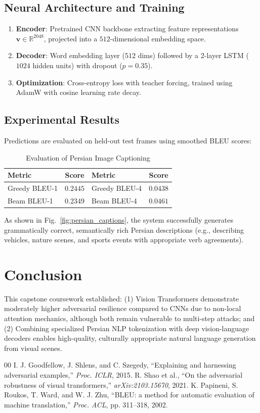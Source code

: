 \documentclass[conference]{IEEEtran}
\begin{document}
\subsection{Neural Architecture and Training}
\begin{enumerate}
    \item \textbf{Encoder}: Pretrained CNN backbone extracting feature representations $\mathbf{v} \in \mathbb{R}^{2048}$, projected into a $512$-dimensional embedding space.
    \item \textbf{Decoder}: Word embedding layer ($512$ dims) followed by a 2-layer LSTM ($1024$ hidden units) with dropout ($p=0.35$).
    \item \textbf{Optimization}: Cross-entropy loss with teacher forcing, trained using AdamW with cosine learning rate decay.
\end{enumerate}

\subsection{Experimental Results}
Predictions are evaluated on held-out test frames using smoothed BLEU scores:
\begin{table}[htbp]
\caption{Evaluation of Persian Image Captioning}
\centering
\begin{tabular}{@{}lc|lc@{}}
\toprule
\textbf{Metric} & \textbf{Score} & \textbf{Metric} & \textbf{Score} \\
\midrule
Greedy BLEU-1 & $0.2445$ & Greedy BLEU-4 & $0.0438$ \\
Beam BLEU-1 & $0.2349$ & Beam BLEU-4 & $0.0461$ \\
\bottomrule
\end{tabular}
\label{tab:persian_bleu}
\end{table}
As shown in Fig.~\ref{fig:persian_captions}, the system successfully generates grammatically correct, semantically rich Persian descriptions (e.g., describing vehicles, nature scenes, and sports events with appropriate verb agreements).

\section{Conclusion}
This capstone coursework established: (1) Vision Transformers demonstrate moderately higher adversarial resilience compared to CNNs due to non-local attention mechanics, although both remain vulnerable to multi-step attacks; and (2) Combining specialized Persian NLP tokenization with deep vision-language decoders enables high-quality, culturally appropriate natural language generation from visual scenes.


\begin{thebibliography}{00}
 I. J. Goodfellow, J. Shlens, and C. Szegedy, ``Explaining and harnessing adversarial examples,'' \textit{Proc. ICLR}, 2015.
 R. Shao et al., ``On the adversarial robustness of visual transformers,'' \textit{arXiv:2103.15670}, 2021.
 K. Papineni, S. Roukos, T. Ward, and W. J. Zhu, ``BLEU: a method for automatic evaluation of machine translation,'' \textit{Proc. ACL}, pp. 311--318, 2002.
\end{thebibliography}
\end{document}
